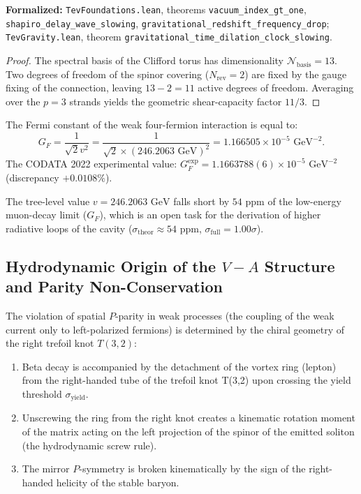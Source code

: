 \documentclass[11pt,a4paper]{article}
\theoremstyle{definition}
\theoremstyle{remark}
\begin{document}
\noindent\small\textbf{Formalized:} \texttt{TevFoundations.lean}, theorems \texttt{vacuum_index_gt_one}, \texttt{shapiro_delay_wave_slowing}, \texttt{gravitational_redshift_frequency_drop}; \texttt{TevGravity.lean}, theorem \texttt{gravitational_time_dilation_clock_slowing}.

\begin{proof}
The spectral basis of the Clifford torus has dimensionality $\mathcal{N}_{\mathrm{basis}} = 13$. Two degrees of freedom of the spinor covering ($N_{\mathrm{rev}} = 2$) are fixed by the gauge fixing of the connection, leaving $13 - 2 = 11$ active degrees of freedom. Averaging over the $p=3$ strands yields the geometric shear-capacity factor $11/3$.
\end{proof}
	
The Fermi constant of the weak four-fermion interaction is equal to:
\begin{equation}
	G_F = \frac{1}{\sqrt{2} v^2} = \frac{1}{\sqrt{2} \times (246.2063\text{ GeV})^2} = 1.166505 \times 10^{-5}\text{ GeV}^{-2}.
\label{eq:fermi_constant_exact}
\end{equation}
The CODATA 2022 experimental value: $G_F^{\mathrm{exp}} = 1.1663788(6) \times 10^{-5}\text{ GeV}^{-2}$ (discrepancy $+0.0108\%$).

The tree-level value $v = 246.2063\text{ GeV}$ falls short by $54\text{ ppm}$ of the low-energy muon-decay limit ($G_F$), which is an open task for the derivation of higher radiative loops of the cavity ($\sigma_{\mathrm{theor}} \approx 54\text{ ppm}$, $\sigma_{\mathrm{full}} = 1.00\sigma$).

\subsection{Hydrodynamic Origin of the $V-A$ Structure and Parity Non-Conservation}

The violation of spatial $P$-parity in weak processes (the coupling of the weak current only to left-polarized fermions) is determined by the chiral geometry of the right trefoil knot $T(3,2)$:
\begin{enumerate}
\item Beta decay is accompanied by the detachment of the vortex ring (lepton) from the right-handed tube of the trefoil knot T(3,2) upon crossing the yield threshold $\sigma_{\mathrm{yield}}$.
\item Unscrewing the ring from the right knot creates a kinematic rotation moment of the matrix acting on the left projection of the spinor of the emitted soliton (the hydrodynamic screw rule).
\item The mirror $P$-symmetry is broken kinematically by the sign of the right-handed helicity of the stable baryon.
\end{enumerate}
\end{document}

